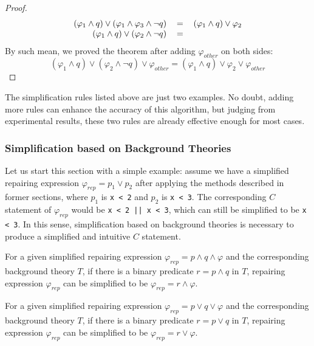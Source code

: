 \begin{proof}
\begin{equation}
\begin{tabular}{rcl}
$(\varphi _{1} \wedge q) \vee (\varphi _{1} \wedge \varphi _{3} \wedge \neg q)$&$=$&$(\varphi _{1} \wedge q) \vee \varphi _{2}$ \\
$(\varphi _{1} \wedge q) \vee (\varphi _{2} \wedge \neg q)$&$=$& \\
\end{tabular}
\end{equation}
By such mean, we proved the theorem after adding $\varphi _{other}$ on both sides:
\begin{equation}
(\varphi _{1} \wedge q) \vee (\varphi _{2} \wedge \neg q) \vee \varphi _{other} = (\varphi _{1} \wedge q) \vee \varphi _{2} \vee \varphi _{other}
\end{equation}
\end{proof}

The simplification rules listed above are just two examples.
No doubt, adding more rules can enhance the accuracy of this algorithm,
but judging from experimental results, these two rules are already effective enough for most cases.

\subsubsection{Simplification based on Background Theories}
Let us start this section with a simple example: assume we have a simplified repairing expression $\varphi _{rep} = p _{1} \vee p _{2}$ after applying the methods described in former sections,
where $p _{1}$ is \lstinline|x < 2| and $p _{2}$ is \lstinline|x < 3|. The corresponding $C$ statement of $\varphi _{rep}$ would be \lstinline{x < 2 || x < 3}, which can still be simplified to be \lstinline|x < 3|.
In this sense, simplification based on background theories is necessary to produce a simplified and intuitive $C$ statement.

\begin{theorem}
\label{theorem:1}
For a given simplified repairing expression $\varphi _{rep} = p \wedge q \wedge \varphi$ and the corresponding background theory $T$, if there is a binary predicate $r = p \wedge q$ in $T$,
repairing expression $\varphi _{rep}$ can be simplified to be $\varphi _{rep} = r \wedge \varphi$.
\end{theorem}
\begin{theorem}
\label{theorem:2}
For a given simplified repairing expression $\varphi _{rep} = p \vee q \vee \varphi$ and the corresponding background theory $T$, if there is a binary predicate $r = p \vee q$ in $T$,
repairing expression $\varphi _{rep}$ can be simplified to be $\varphi _{rep} = r \vee \varphi$.
\end{theorem}


